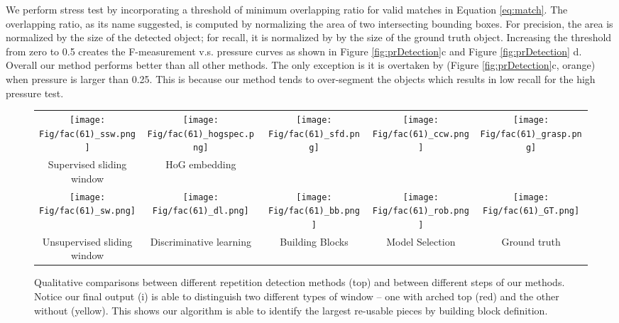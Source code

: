 \documentclass{acmtog}
\begin{document}
We perform stress test by incorporating a threshold of minimum overlapping ratio for valid matches in Equation \ref{eq:match}.  The overlapping ratio, as its name suggested, is computed by normalizing the area of two intersecting bounding boxes. For precision, the area is normalized by the size of the detected object; for recall, it is normalized by by the size of the ground truth object. Increasing the threshold from zero to 0.5 creates the F-measurement v.s. pressure curves as shown in Figure \ref{fig:prDetection}c and Figure \ref{fig:prDetection} d. Overall our method performs better than all other methods. The only exception is it is overtaken by \cite{Wu2010DL} (Figure \ref{fig:prDetection}c, orange) when pressure is larger than 0.25. This is because our method tends to over-segment the objects which results in low recall for the high pressure test. 


\begin{figure*}[t!]
  \centering
	\begin{tabular}{ccccc}
    \centering
		\texttt{[image: Fig/fac(61)\_ssw.png]} &
		\texttt{[image: Fig/fac(61)\_hogspec.png]} &
		\texttt{[image: Fig/fac(61)\_sfd.png]} &
		\texttt{[image: Fig/fac(61)\_ccw.png]} &
		\texttt{[image: Fig/fac(61)\_grasp.png]} \\
    Supervised sliding window &
    HoG embedding &
    \protect\cite{LIPMANsig2010} &
    \protect\cite{Wu2010DL} &
    \protect\cite{Liu2013GRASP} \vspace{3mm} \\
		\texttt{[image: Fig/fac(61)\_sw.png]} &
		\texttt{[image: Fig/fac(61)\_dl.png]} &
		\texttt{[image: Fig/fac(61)\_bb.png]} &
		\texttt{[image: Fig/fac(61)\_rob.png]} &
		\texttt{[image: Fig/fac(61)\_GT.png]} \\
		Unsupervised sliding window&
    Discriminative learning&
    Building Blocks&
    Model Selection&
    Ground truth
	\end{tabular}
    \caption{Qualitative comparisons between different repetition detection methods (top) and between different steps of our methods. Notice our final output (i) is able to distinguish two different types of window -- one with arched top (red) and the other without (yellow). This shows our algorithm is able to identify the largest re-usable pieces by building block definition. }%
    \label{fig:QLTDetection}%
\end{figure*}
\end{document}
